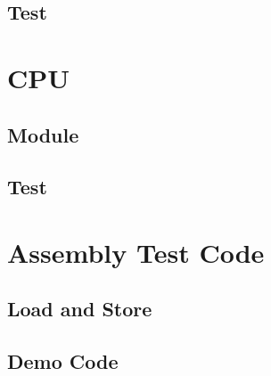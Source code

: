 \documentclass[11pt]{article}
\begin{document}
\subsection{Test}
\tiny 
\section{CPU}
\subsection{Module}
\tiny 
\subsection{Test}
\tiny 
\section{Assembly Test Code}
\subsection{Load and Store}
\tiny 
\subsection{Demo Code}
\label{test:demo}
\tiny 
\end{document}
